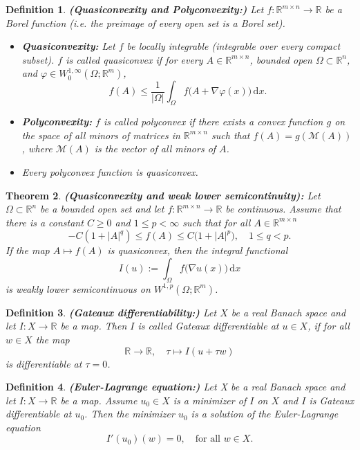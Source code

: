 \documentclass[12pt,openany]{book}
\newcommand{\R}{\mathbb{R}}
\theoremstyle{plainnormal}
\newtheorem{theorem}{Theorem}[section]
\newtheorem{definition}[theorem]{Definition}
\theoremstyle{remark}
\begin{document}
\begin{definition}\textbf{(Quasiconvexity and Polyconvexity:)}
Let $f:\mathbb{R}^{m\times n} \to \mathbb{R}$ be a Borel function (i.e. the preimage of every open set is a Borel set).  
\begin{itemize}
    \item \textbf{Quasiconvexity:} Let $f$ be locally integrable (integrable over every compact subset). $f$ is called \emph{quasiconvex} if for every $A \in \mathbb{R}^{m\times n}$, bounded open $\Omega \subset \mathbb{R}^n$, and $\varphi \in W^{1,\infty}_0(\Omega;\mathbb{R}^m)$,
\[
f(A) \leq \frac{1}{|\Omega|} \int_{\Omega} f\bigl(A + \nabla\varphi(x)\bigr)\,\mathrm{d}x .
\]
\item \textbf{Polyconvexity:} $f$ is called \emph{polyconvex} if there exists a convex function $g$ on the space of all minors of matrices in $\mathbb{R}^{m\times n}$ such that $f(A) = g(\mathcal{M}(A))$, where $\mathcal{M}(A)$ is the vector of all minors of $A$.  
\item Every \emph{polyconvex} function is \emph{quasiconvex}.
\end{itemize}

\end{definition}

\begin{theorem}\label{thm:quasiconv}\textbf{(Quasiconvexity and weak lower semicontinuity):}
Let $\Omega\subset\mathbb{R}^n$ be a bounded open set and let
\(
f:\mathbb{R}^{m\times n}\to\mathbb{R}
\) be continuous. Assume that there is a constant $C\geq0$ and $1\leq p < \infty$ such that for all $A\in\mathbb{R}^{m\times n}$
\[
-C(1+|A|^q) \le f(A) \le C\bigl(1+|A|^p\bigr), \quad 1\leq q < p.
\]
If the map $A\mapsto f(A)$ is quasiconvex, then the integral functional
\[
I(u):=\int_\Omega f\bigl(\nabla u(x)\bigr)\,\mathrm{d}x
\]
is weakly lower semicontinuous on $W^{1,p}(\Omega;\mathbb{R}^m)$.
\end{theorem}

\begin{definition}\textbf{(Gateaux differentiability:)}
    Let $X$ be a real Banach space and let \mbox{$I: X\rightarrow\R$} be a map. Then $I$ is called \emph{Gateaux differentiable} at $u\in X$, if for all $w\in X$ the map $$\R \rightarrow\R, \quad \tau \mapsto I(u + \tau w)$$ is differentiable at $\tau = 0$.
\end{definition}
\begin{definition}\label{EL_eq}\textbf{(Euler-Lagrange equation:)}
Let X be a real Banach space and let \mbox{$I: X\rightarrow\R$} be a map. Assume $u_0\in X$ is a minimizer of $I$ on $X$ and $I$ is Gateaux differentiable at $u_0$. Then the minimizer $u_0$ is a solution of the \emph{Euler-Lagrange equation} $$I'(u_0)(w) = 0, \quad \text{for all } w \in X.$$
\end{definition}
\end{document}
